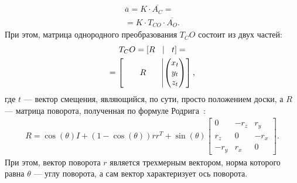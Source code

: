 \documentclass[12pt, a4paper]{article}
\begin{document}
\begin{equation}
\begin{gathered}
    \overline{a} = K \cdot \overline{A_C} = \\
    = K \cdot T_{CO} \cdot \overline{A_O}.
\end{gathered}
\label{eqn:full_projection}
\end{equation}
При этом, матрица однородного преобразования $T_CO$ состоит из двух частей:
\begin{equation}
\begin{gathered}
    T_CO = \left[ R \quad \vline \quad t \right] = \\
    = \left[
        \qquad R \qquad \vline \begin{pmatrix}
        x_t\\
        y_t\\
        z_t
    \end{pmatrix}
    \right],
\end{gathered}
\label{eqn:projection_matrix_tf}
\end{equation}
где $t$ --- вектор смещения, являющийся, по сути, просто положением доски, а $R$ ---
матрица поворота, полученная по формуле Родрига~\cite{opencv_rodrigues}:
\begin{equation}
\begin{gathered}
    R = \cos(\theta) I + (1 - \cos(\theta))r r^T + \sin(\theta) \begin{bmatrix}
         0   & -r_z & r_y\\
        r_z  & 0    & -r_x\\
        -r_y & r_x  & 0
    \end{bmatrix}.
\end{gathered}
\label{eqn:rodrigues_formula}
\end{equation}
При этом, вектор поворота $r$ является трехмерным вектором, норма которого равна
$\theta$ --- углу поворота, а сам вектор характеризует ось поворота.
\end{document}

